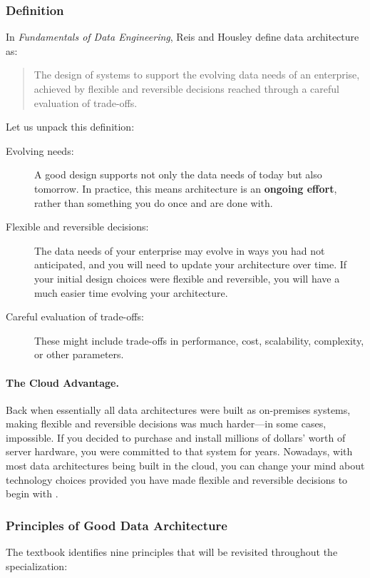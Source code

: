 \documentclass{article}
\begin{document}
\subsubsection{Definition}
In \textit{Fundamentals of Data Engineering}, Reis and Housley define data architecture as:
\begin{quote}
    The design of systems to support the evolving data needs of an enterprise, achieved by flexible and reversible decisions reached through a careful evaluation of trade-offs.
\end{quote}

Let us unpack this definition:
\begin{description}
    \item[Evolving needs:] A good design supports not only the data needs of today but also tomorrow. In practice, this means architecture is an \textbf{ongoing effort}, rather than something you do once and are done with.
    \item[Flexible and reversible decisions:] The data needs of your enterprise may evolve in ways you had not anticipated, and you will need to update your architecture over time. If your initial design choices were flexible and reversible, you will have a much easier time evolving your architecture.
    \item[Careful evaluation of trade-offs:] These might include trade-offs in performance, cost, scalability, complexity, or other parameters.
\end{description}

\paragraph{The Cloud Advantage.} Back when essentially all data architectures were built as on-premises systems, making flexible and reversible decisions was much harder---in some cases, impossible. If you decided to purchase and install millions of dollars' worth of server hardware, you were committed to that system for years. Nowadays, with most data architectures being built in the cloud, you can change your mind about technology choices provided you have made flexible and reversible decisions to begin with \cite{reis2022fundamentals}.

\subsubsection{Principles of Good Data Architecture}
The textbook identifies nine principles that will be revisited throughout the specialization:
\end{document}
